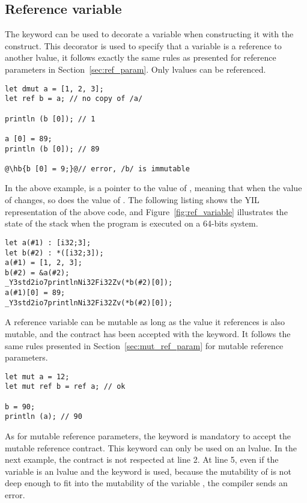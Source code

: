 \subsection{Reference variable}

The  keyword can be used to decorate a variable when constructing it
with the  construct. This decorator is used to specify that a
variable is a reference to another lvalue, it follows exactly the same rules as
presented for reference parameters in Section~\ref{sec:ref_param}. Only lvalues
can be referenced.

\begin{lstlisting}[style=coloredverbatim, escapechar=@]
let dmut a = [1, 2, 3];
let ref b = a; // no copy of /a/

println (b [0]); // 1

a [0] = 89;
println (b [0]); // 89

@\hb{b [0] = 9;}@// error, /b/ is immutable
\end{lstlisting}

In the above example,  is a pointer to the value of ,
meaning that when the value of  changes, so does the value of
. The following listing shows the YIL representation of the above
code, and Figure~\ref{fig:ref_variable} illustrates the state of the stack when the
program is executed on a 64-bits system.

\begin{lstlisting}[style=intermediateVerb]
let a(#1) : [i32;3];
let b(#2) : *([i32;3]);
a(#1) = [1, 2, 3];
b(#2) = &a(#2);
_Y3std2io7printlnNi32Fi32Zv(*b(#2)[0]);
a(#1)[0] = 89;
_Y3std2io7printlnNi32Fi32Zv(*b(#2)[0]);
\end{lstlisting}



A reference variable can be mutable as long as the value it references is also
mutable, and the contract has been accepted with the  keyword. It
follows the same rules presented in Section~\ref{sec:mut_ref_param} for mutable
reference parameters.

\begin{lstlisting}[style=coloredverbatim, escapechar=@]
let mut a = 12;
let mut ref b = ref a; // ok

b = 90;
println (a); // 90
\end{lstlisting}

As for mutable reference parameters, the keyword  is mandatory to
accept the mutable reference contract. This keyword can only be used on an
lvalue. In the next example, the contract is not respected at line 2. At line 5,
even if the variable is an lvalue and the keyword  is used, because
the mutability of  is not deep enough to fit into the mutability of
the variable , the compiler sends an error.

